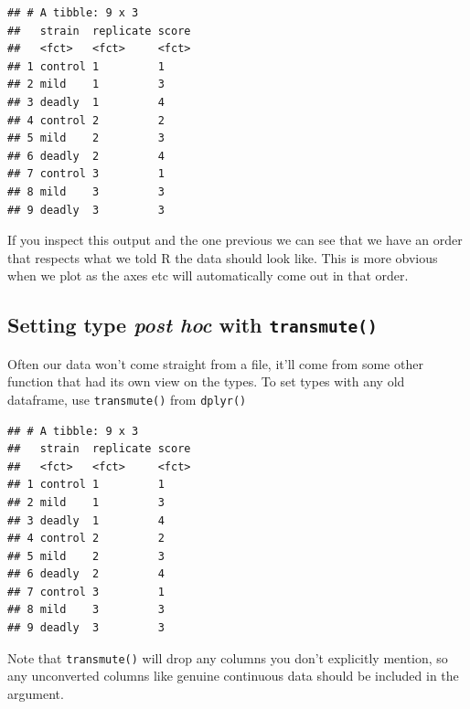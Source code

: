 \documentclass[
]{book}
\newenvironment{Shaded}{\begin{snugshade}}{\end{snugshade}}
\newcommand{\DataTypeTok}[1]{\textcolor[rgb]{0.13,0.29,0.53}{#1}}
\newcommand{\KeywordTok}[1]{\textcolor[rgb]{0.13,0.29,0.53}{\textbf{#1}}}
\newcommand{\NormalTok}[1]{#1}
\newcommand{\OperatorTok}[1]{\textcolor[rgb]{0.81,0.36,0.00}{\textbf{#1}}}
\newcommand{\StringTok}[1]{\textcolor[rgb]{0.31,0.60,0.02}{#1}}
\begin{document}
\begin{verbatim}
## # A tibble: 9 x 3
##   strain  replicate score
##   <fct>   <fct>     <fct>
## 1 control 1         1    
## 2 mild    1         3    
## 3 deadly  1         4    
## 4 control 2         2    
## 5 mild    2         3    
## 6 deadly  2         4    
## 7 control 3         1    
## 8 mild    3         3    
## 9 deadly  3         3
\end{verbatim}

If you inspect this output and the one previous we can see that we have an order that respects what we told R the data should look like. This is more obvious when we plot as the axes etc will automatically come out in that order.

\hypertarget{setting-type-post-hoc-with-transmute}{%
\subsection{\texorpdfstring{Setting type \emph{post hoc} with \texttt{transmute()}}{Setting type post hoc with transmute()}}\label{setting-type-post-hoc-with-transmute}}

Often our data won't come straight from a file, it'll come from some other function that had its own view on the types. To set types with any old dataframe, use \texttt{transmute()} from \texttt{dplyr()}

\begin{Shaded}
\end{Shaded}

\begin{verbatim}
## # A tibble: 9 x 3
##   strain  replicate score
##   <fct>   <fct>     <fct>
## 1 control 1         1    
## 2 mild    1         3    
## 3 deadly  1         4    
## 4 control 2         2    
## 5 mild    2         3    
## 6 deadly  2         4    
## 7 control 3         1    
## 8 mild    3         3    
## 9 deadly  3         3
\end{verbatim}

Note that \texttt{transmute()} will drop any columns you don't explicitly mention, so any unconverted columns like genuine continuous data should be included in the argument.
\end{document}
